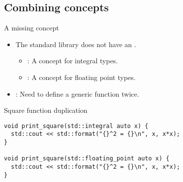 \subsection{Combining concepts}

\begin{frame}[t,fragile]{A missing concept}
\begin{itemize}
  \item The standard library does not have an  .
    \begin{itemize}
      \item {}: A concept for integral types.
      \item {}: A concept for floating point types.
    \end{itemize}

  \item {}: Need to define a generic function twice.
\end{itemize}


\begin{block}{Square function duplication}
\begin{lstlisting}
void print_square(std::integral auto x) {
  std::cout << std::format("{}^2 = {}\n", x, x*x);
}

void print_square(std::floating_point auto x) {
  std::cout << std::format("{}^2 = {}\n", x, x*x);
}
\end{lstlisting}
\end{block}
\end{frame}

